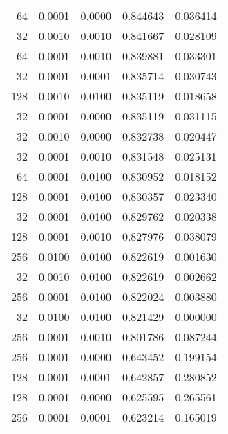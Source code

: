 \begin{tabular}{rrrrr}
  64 &  0.0001 &  0.0000 &  0.844643 &  0.036414 \\
  32 &  0.0010 &  0.0010 &  0.841667 &  0.028109 \\
  64 &  0.0001 &  0.0010 &  0.839881 &  0.033301 \\
  32 &  0.0001 &  0.0001 &  0.835714 &  0.030743 \\
 128 &  0.0010 &  0.0100 &  0.835119 &  0.018658 \\
  32 &  0.0001 &  0.0000 &  0.835119 &  0.031115 \\
  32 &  0.0010 &  0.0000 &  0.832738 &  0.020447 \\
  32 &  0.0001 &  0.0010 &  0.831548 &  0.025131 \\
  64 &  0.0001 &  0.0100 &  0.830952 &  0.018152 \\
 128 &  0.0001 &  0.0100 &  0.830357 &  0.023340 \\
  32 &  0.0001 &  0.0100 &  0.829762 &  0.020338 \\
 128 &  0.0001 &  0.0010 &  0.827976 &  0.038079 \\
 256 &  0.0100 &  0.0100 &  0.822619 &  0.001630 \\
  32 &  0.0010 &  0.0100 &  0.822619 &  0.002662 \\
 256 &  0.0001 &  0.0100 &  0.822024 &  0.003880 \\
  32 &  0.0100 &  0.0100 &  0.821429 &  0.000000 \\
 256 &  0.0001 &  0.0010 &  0.801786 &  0.087244 \\
 256 &  0.0001 &  0.0000 &  0.643452 &  0.199154 \\
 128 &  0.0001 &  0.0001 &  0.642857 &  0.280852 \\
 128 &  0.0001 &  0.0000 &  0.625595 &  0.265561 \\
 256 &  0.0001 &  0.0001 &  0.623214 &  0.165019 \\
\bottomrule
\end{tabular}
